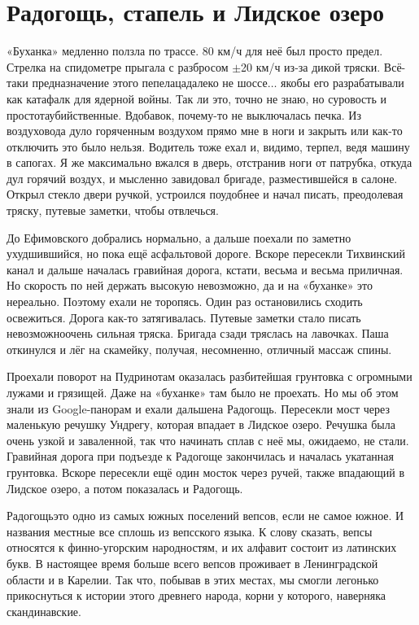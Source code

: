 \chapter{Радогощь, стапель и Лидское озеро} 

«Буханка» медленно ползла по трассе. 80 км/ч для неё был просто предел. Стрелка на спидометре прыгала с разбросом $\pm$20 км/ч из-за дикой тряски. Всё-таки предназначение этого пепелаца\mdash далеко не шоссе$\ldots$ якобы его разрабатывали как катафалк для ядерной войны. Так ли это, точно не знаю, но суровость и простота\mdash убийственные. Вдобавок, почему-то не выключалась печка. Из воздуховода дуло горяченным воздухом прямо мне в ноги и закрыть или как-то отключить это было нельзя. Водитель тоже ехал и, видимо, терпел, ведя машину в сапогах. Я же максимально вжался в дверь, отстранив ноги от патрубка, откуда дул горячий воздух, и мысленно завидовал бригаде, разместившейся в салоне. Открыл стекло двери ручкой, устроился поудобнее и начал писать, преодолевая тряску, путевые заметки, чтобы отвлечься. 

До Ефимовского добрались нормально, а дальше поехали по заметно ухудшившийся, но пока ещё асфальтовой дороге. Вскоре пересекли Тихвинский канал и дальше началась гравийная дорога, кстати, весьма и весьма приличная. Но скорость по ней держать высокую невозможно, да и на «буханке» это нереально. Поэтому ехали не торопясь. Один раз остановились сходить освежиться. Дорога как-то затягивалась. Путевые заметки стало писать невозможно\mdash очень сильная тряска. Бригада сзади тряслась на лавочках. Паша откинулся и лёг на скамейку, получая, несомненно, отличный массаж спины.

Проехали поворот на Пудрино\mdash там оказалась разбитейшая грунтовка с огромными лужами и грязищей. Даже на «буханке» там было не проехать. Но мы об этом знали из Google-панорам и ехали дальше\mdash на Радогощь. Пересекли мост через маленькую речушку Ундрегу, которая впадает в Лидское озеро. Речушка была очень узкой и заваленной, так что начинать сплав с неё мы, ожидаемо, не стали. Гравийная дорога при подъезде к Радогоще закончилась и началась укатанная грунтовка. Вскоре пересекли ещё один мосток через ручей, также впадающий в Лидское озеро, а потом показалась и Радогощь. 

Радогощь\mdash это одно из самых южных поселений вепсов, если не самое южное. И названия местные все сплошь из вепсского языка. К слову сказать, вепсы относятся к финно-угорским народностям, и их алфавит состоит из латинских букв. В настоящее время больше всего вепсов проживает в Ленинградской области и в Карелии. Так что, побывав в этих местах, мы смогли легонько прикоснуться к истории этого древнего народа, корни у которого, наверняка скандинавские. 

